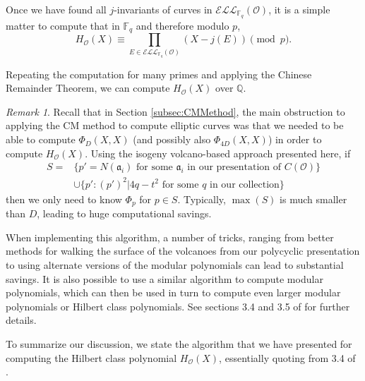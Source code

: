 \documentclass{amsart}
\theoremstyle{definition}
\theoremstyle{remark}
\newtheorem{remark}[thm]{Remark}
\numberwithin{equation}{section}
\newcommand{\cE}{\mathcal E}
\newcommand{\cL}{\mathcal L}
\newcommand{\cO}{\mathcal O}
\newcommand{\fka}{\mathfrak a}
\newcommand{\bbF}{\mathbb F}
\newcommand{\bbQ}{\mathbb Q}
\newcommand{\ELL}{\cE\cL\cL}
\begin{document}
Once we have found all $j$-invariants of curves in $\ELL_{\bbF_{q}}(\cO)$, it is a simple matter to compute that in $\bbF_{q}$ and therefore modulo $p$,
\[
H_{\cO}(X) \equiv \prod_{E \in \ELL_{\bbF_{q}}(\cO)} (X - j(E)) \pmod{p}.
\]

Repeating the computation for many primes and applying the Chinese Remainder Theorem, we can compute $H_{\cO}(X)$ over $\bbQ$.

\begin{remark}
Recall that in Section \ref{subsec:CMMethod}, the main obstruction to applying the CM method to compute elliptic curves was that we needed to be able to compute $\Phi_{D}(X,X)$ (and possibly also $\Phi_{4D}(X,X)$) in order to compute $H_{\cO}(X)$. Using the isogeny volcano-based approach presented here, if 
\begin{align*}
S =  & \{p' = N(\fka_{i}) \text{ for some } \fka_{i} \text{ in our presentation of } C(\cO)\} \\
    & \cup \{p': (p')^2| 4q - t^2 \text{ for some $q$ in our collection}\}
\end{align*}
then we only need to know $\Phi_{p}$ for $p \in S$. Typically, $\max(S)$ is much smaller than $D$, leading to huge computational savings.
\end{remark}
 
 When implementing this algorithm, a number of tricks, ranging from better methods for walking the surface of the volcanoes from our polycyclic presentation to using alternate versions of the modular polynomials can lead to substantial savings. It is also possible to use a similar algorithm to compute modular polynomials, which can then be used in turn to compute even larger modular polynomials or Hilbert class polynomials. See sections 3.4 and 3.5 of \cite{SutherlandIV} for further details.

To summarize our discussion, we state the algorithm that we have presented for computing the Hilbert class polynomial $H_{\cO}(X)$, essentially quoting from 3.4 of \cite{SutherlandIV}.
\end{document}
